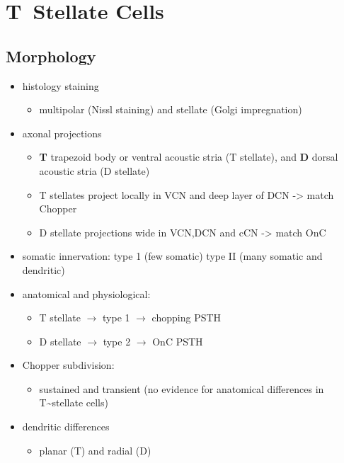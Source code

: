 \section{T~Stellate Cells}\label{sec:t-stellate-cells}

\subsection{Morphology}

\begin{itemize}
\item histology staining
\begin{itemize}
\item multipolar (Nissl staining) and stellate (Golgi impregnation) \citep{Osen:1969,BrawerMorestEtAl:1974,Lorente:1981}
\end{itemize}
\item axonal projections
\begin{itemize}
\item \textbf{T} trapezoid body or ventral acoustic stria (T stellate), and \textbf{D} dorsal acoustic stria (D stellate) \citep{OertelWuEtAl:1990}
\item T stellates project locally in VCN and deep layer of DCN -> match Chopper \citep{RhodeOertelEtAl:1983,SmithRhode:1989}
\item D stellate projections wide in VCN,DCN and cCN -> match OnC  \citep{SmithRhode:1989}
\end{itemize}
\item somatic innervation: type 1 (few somatic) type II (many somatic and dendritic) \citep{Cant:1981}
\item anatomical and physiological: \citet{SmithRhode:1989}
\begin{itemize}
\item T stellate $\rightarrow$ type 1 $\rightarrow$ chopping PSTH
\item D stellate $\rightarrow$ type 2 $\rightarrow$ OnC PSTH
\end{itemize}
\item Chopper subdivision:
\begin{itemize}
\item sustained and transient (no evidence for anatomical differences in T\~{}stellate cells)
\end{itemize}
\item dendritic differences \citep{DoucetRyugo:1997,DoucetRyugo:2006}
\begin{itemize}
\item planar (T) and radial (D)
\end{itemize}
\end{itemize}

